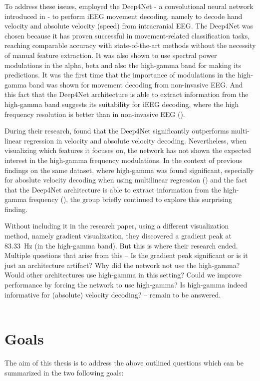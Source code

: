 To address these issues, \cite{Hammer-2021} employed the Deep4Net - a convolutional neural network introduced in \cite{schirrmeister-deep-2017} - to perform iEEG movement decoding, namely to decode hand velocity and absolute velocity (speed) from intracranial EEG. 
The Deep4Net was chosen because it has proven successful in movement-related classification tasks, reaching comparable accuracy with state-of-the-art methods without the necessity of manual feature extraction.
It was also shown to use spectral power modulations in the alpha, beta and also the high-gamma band for making its predictions. 
It was the first time that the importance of modulations in the high-gamma band was shown for movement decoding from non-invasive EEG.
And this fact that the Deep4Net architecture is able to extract information from the high-gamma band suggests its suitability for iEEG decoding, where the high frequency resolution is better than in non-invasive EEG (\cite{gamma-eeg-bad-resolution}). 

During their research, \cite{Hammer-2021} found that the Deep4Net significantly outperforms multi-linear regression in velocity and absolute velocity decoding.
Nevertheless, when visualizing which features it focuses on, the network has not shown the expected interest in the high-gamma frequency modulations. 
In the context of previous findings on the same dataset, where high-gamma was found significant, especially for aboslute velocity decoding when using multilinear regression (\cite{hammer-predominance-2016}) and the fact that the Deep4Net architecture is able to extract information from the high-gamma frequency (\cite{schirrmeister-deep-2017}), the group briefly continued to explore this surprising finding.

Without including it in the research paper, using a different visualization method, namely gradient visualization, they discovered a gradient peak at 83.33~Hz (in the high-gamma band).
But this is where their research ended. 
Multiple questions that arise from this -- Is the gradient peak significant or is it just an architecture artifact?
Why did the network not use the high-gamma?
Would other architectures use high-gamma in this setting?
Could we improve performance by forcing the network to use high-gamma?
Is high-gamma indeed informative for (absolute) velocity decoding? -- remain to be answered. \\
\\


\section*{Goals}
The aim of this thesis is to address the above outlined questions which can be summarized in the two following goals:

